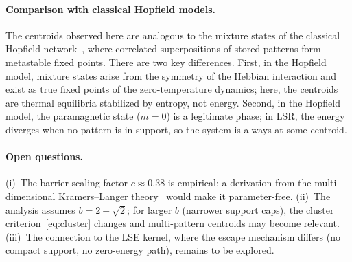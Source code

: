 \documentclass[11pt]{article}
\begin{document}
\paragraph{Comparison with classical Hopfield models.}
The centroids observed here are analogous to the mixture states of the classical Hopfield network~\citep{amit1987statistical}, where correlated superpositions of stored patterns form metastable fixed points.  There are two key differences.  First, in the Hopfield model, mixture states arise from the symmetry of the Hebbian interaction and exist as true fixed points of the zero-temperature dynamics; here, the centroids are thermal equilibria stabilized by entropy, not energy.  Second, in the Hopfield model, the paramagnetic state ($m = 0$) is a legitimate phase; in LSR, the energy diverges when no pattern is in support, so the system is always at some centroid.

\paragraph{Open questions.}
(i)~The barrier scaling factor $c \approx 0.38$ is empirical; a derivation from the multi-dimensional Kramers--Langer theory~\citep{langer1969,hanggi1990} would make it parameter-free.  (ii)~The analysis assumes $b = 2+\sqrt{2}$; for larger $b$ (narrower support caps), the cluster criterion~\eqref{eq:cluster} changes and multi-pattern centroids may become relevant.  (iii)~The connection to the LSE kernel, where the escape mechanism differs (no compact support, no zero-energy path), remains to be explored.


\end{document}
